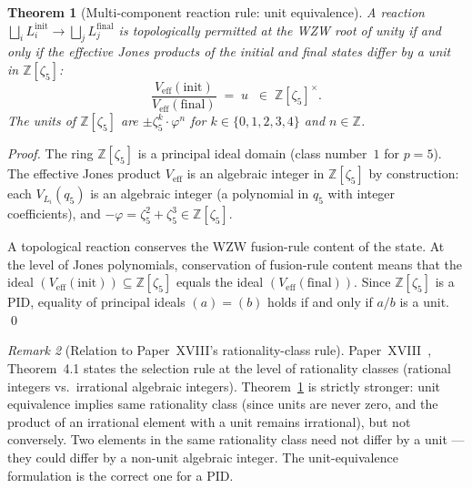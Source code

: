 \documentclass[11pt,a4paper]{article}
\newtheorem{theorem}{Theorem}[section]
\theoremstyle{definition}\newtheorem{definition}[theorem]{Definition}
\theoremstyle{remark}
\newtheorem{remark}[theorem]{Remark}
\newcommand{\vp}{\varphi}
\newcommand{\Jones}{V}
\begin{document}
\begin{theorem}[Multi-component reaction rule: unit equivalence]
\label{P19:thm:unit_reaction_rule}
A reaction
$\bigsqcup_i L_i^{\mathrm{init}}
\to
\bigsqcup_j L_j^{\mathrm{final}}$
is topologically permitted at the WZW root of unity if and only if
the effective Jones products of the initial and final states differ
by a unit in $\mathbb{Z}[\zeta_5]$:
\begin{equation}
  \frac{\Jones_{\mathrm{eff}}(\mathrm{init})}
       {\Jones_{\mathrm{eff}}(\mathrm{final})}
  \;=\; u
  \;\;\in\; \mathbb{Z}[\zeta_5]^\times.
  \label{P19:eq:unit_rule}
\end{equation}
The units of $\mathbb{Z}[\zeta_5]$ are
$\pm\zeta_5^k\cdot\vp^n$ for $k\in\{0,1,2,3,4\}$ and
$n\in\mathbb{Z}$.
\end{theorem}

\begin{proof}
The ring $\mathbb{Z}[\zeta_5]$ is a principal ideal domain
(class number~$1$ for $p=5$).  The effective Jones product
$\Jones_{\mathrm{eff}}$ is an algebraic integer in
$\mathbb{Z}[\zeta_5]$ by construction: each $\Jones_{L_i}(q_5)$
is an algebraic integer (a polynomial in $q_5$ with integer
coefficients), and $-\vp=\zeta_5^2+\zeta_5^3\in\mathbb{Z}[\zeta_5]$.

A topological reaction conserves the WZW fusion-rule content of the
state.  At the level of Jones polynomials, conservation of
fusion-rule content means that the ideal
$(\Jones_{\mathrm{eff}}(\mathrm{init}))\subseteq
\mathbb{Z}[\zeta_5]$ equals the ideal
$(\Jones_{\mathrm{eff}}(\mathrm{final}))$.  Since
$\mathbb{Z}[\zeta_5]$ is a PID, equality of principal ideals
$(a)=(b)$ holds if and only if $a/b$ is a unit.
\qed
\end{proof}

\begin{remark}[Relation to Paper~XVIII's rationality-class rule]
\label{P19:rem:rationality_vs_unit}
Paper~XVIII~\cite{Paper18}, Theorem~4.1 states the selection rule %
at the level of rationality classes (rational integers vs.\
irrational algebraic integers).  Theorem~\ref{P19:thm:unit_reaction_rule}
is strictly stronger: unit equivalence implies same rationality
class (since units are never zero, and the product of an irrational
element with a unit remains irrational), but not conversely.  Two
elements in the same rationality class need not differ by a unit
--- they could differ by a non-unit algebraic integer.  The
unit-equivalence formulation is the correct one for a PID.
\end{remark}
\end{document}
